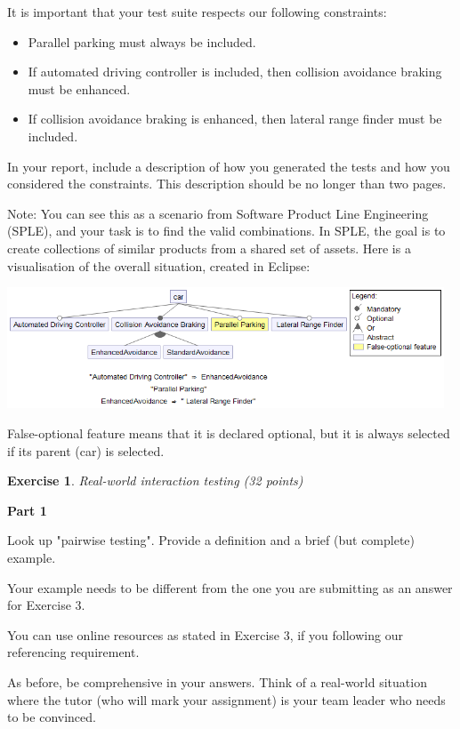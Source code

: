 \documentclass{pracs}
\newtheorem{exercise}{Exercise}
\begin{document}
It is important that your test suite respects our following constraints:
\begin{itemize}
\item Parallel parking must always be included.
\item If automated driving controller is included, then collision avoidance braking must be enhanced.
\item If collision avoidance braking is enhanced, then lateral range finder must be included.
\end{itemize}

In your report, include a description of how you generated the tests and how you considered the constraints. This description should be no longer than two pages.

Note: You can see this as a scenario from Software Product Line Engineering (SPLE), and your task is to find the valid combinations. In SPLE, the goal is to create collections of similar products from a shared set of assets. Here is a visualisation of the overall situation, created in Eclipse:

\begin{center}
\includegraphics[width=130mm]{q3p2_car_assignment1AbstractConstraints.png}
\end{center}

False-optional feature means that it is declared optional, but it is always selected if its parent (car) is selected.


\begin{exercise}
Real-world interaction testing (32 points)
\end{exercise}

\textbf{Part 1}

Look up "pairwise testing". Provide a definition and a brief (but complete) example.

Your example needs to be different from the one you are submitting as an answer for Exercise 3.

You can use online resources as stated in Exercise 3, if you following our referencing requirement.

As before, be comprehensive in your answers. Think of a real-world situation where the tutor (who will mark your assignment) is your team leader who needs to be convinced.
\end{document}
